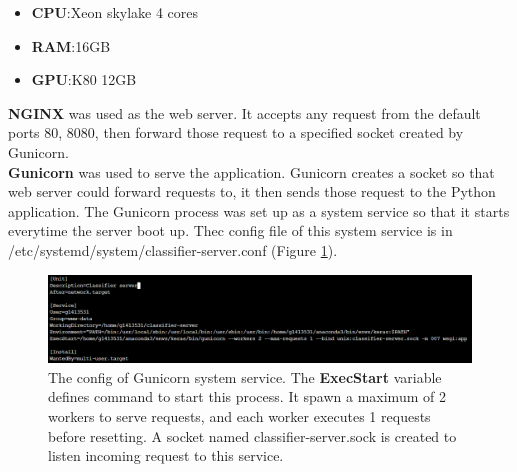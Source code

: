 \begin{itemize}
	\item \textbf{CPU}:Xeon skylake 4 cores
	\item \textbf{RAM}:16GB
	\item \textbf{GPU}:K80 12GB
\end{itemize}
\textbf{NGINX} was used as the web server. It accepts any request from the default ports 80, 8080, then forward those request to a specified socket created by Gunicorn.\\
\textbf{Gunicorn} was used to serve the application. Gunicorn creates a socket so that web server could forward requests to, it then sends those request to the Python application. The Gunicorn process was set up as a system service so that it starts everytime the server boot up. Thec config file of this system service is in /etc/systemd/system/classifier-server.conf (Figure \ref{chap4:server_config}).
\begin{center}
    \begin{figure}[H]
    \centering
    \includegraphics[width=1\columnwidth]{images/chap4/server_config.png}
	\caption{The config of Gunicorn system service. The \textbf{ExecStart} variable defines command to start this process. It spawn a maximum of 2 workers to serve requests, and each worker executes 1 requests before resetting. A socket named classifier-server.sock  is created to listen incoming request to this service.}   
	\label{chap4:server_config}
    \end{figure}
\end{center}

